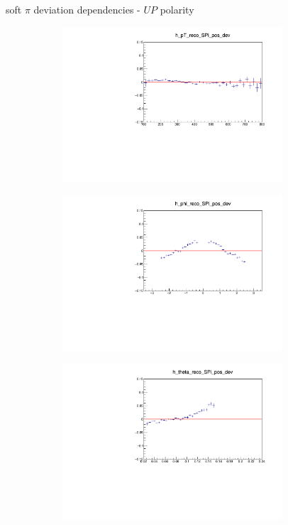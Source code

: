 \documentclass[11pt]{beamer}
\begin{document}
\begin{frame}{soft $\pi$ deviation dependencies - $UP$ polarity}
\begin{figure}
\begin{subfigure}{0.45\textwidth}
\includegraphics[width=0.9\textwidth]{third/up_pdf/deviation/h_pt_reco_SPi_pos_dev.pdf}
\end{subfigure}
\begin{subfigure}{0.45\textwidth}
\includegraphics[width=0.9\textwidth]{third/up_pdf/deviation/h_phi_reco_SPi_pos_dev.pdf}
\end{subfigure}
\begin{subfigure}{0.45\textwidth}
\includegraphics[width=0.9\textwidth]{third/up_pdf/deviation/h_theta_reco_SPi_pos_dev.pdf}

\end{subfigure}
\end{figure}
\end{frame}
\end{document}
